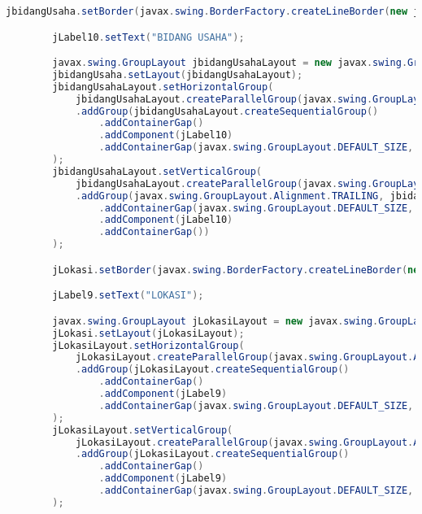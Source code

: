 \begin{lstlisting}[language=Java, caption=TampilanKondisiKetetanggaan.java]
        jbidangUsaha.setBorder(javax.swing.BorderFactory.createLineBorder(new java.awt.Color(0, 0, 0)));

        jLabel10.setText("BIDANG USAHA");

        javax.swing.GroupLayout jbidangUsahaLayout = new javax.swing.GroupLayout(jbidangUsaha);
        jbidangUsaha.setLayout(jbidangUsahaLayout);
        jbidangUsahaLayout.setHorizontalGroup(
            jbidangUsahaLayout.createParallelGroup(javax.swing.GroupLayout.Alignment.LEADING)
            .addGroup(jbidangUsahaLayout.createSequentialGroup()
                .addContainerGap()
                .addComponent(jLabel10)
                .addContainerGap(javax.swing.GroupLayout.DEFAULT_SIZE, Short.MAX_VALUE))
        );
        jbidangUsahaLayout.setVerticalGroup(
            jbidangUsahaLayout.createParallelGroup(javax.swing.GroupLayout.Alignment.LEADING)
            .addGroup(javax.swing.GroupLayout.Alignment.TRAILING, jbidangUsahaLayout.createSequentialGroup()
                .addContainerGap(javax.swing.GroupLayout.DEFAULT_SIZE, Short.MAX_VALUE)
                .addComponent(jLabel10)
                .addContainerGap())
        );

        jLokasi.setBorder(javax.swing.BorderFactory.createLineBorder(new java.awt.Color(0, 0, 0)));

        jLabel9.setText("LOKASI");

        javax.swing.GroupLayout jLokasiLayout = new javax.swing.GroupLayout(jLokasi);
        jLokasi.setLayout(jLokasiLayout);
        jLokasiLayout.setHorizontalGroup(
            jLokasiLayout.createParallelGroup(javax.swing.GroupLayout.Alignment.LEADING)
            .addGroup(jLokasiLayout.createSequentialGroup()
                .addContainerGap()
                .addComponent(jLabel9)
                .addContainerGap(javax.swing.GroupLayout.DEFAULT_SIZE, Short.MAX_VALUE))
        );
        jLokasiLayout.setVerticalGroup(
            jLokasiLayout.createParallelGroup(javax.swing.GroupLayout.Alignment.LEADING)
            .addGroup(jLokasiLayout.createSequentialGroup()
                .addContainerGap()
                .addComponent(jLabel9)
                .addContainerGap(javax.swing.GroupLayout.DEFAULT_SIZE, Short.MAX_VALUE))
        );


\end{lstlisting}
